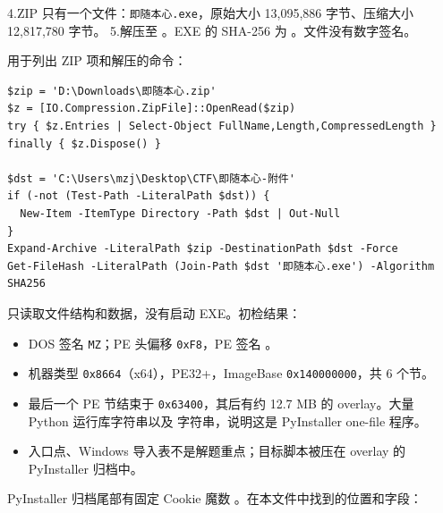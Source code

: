 4.ZIP 只有一个文件：\texttt{即随本心.exe}，原始大小 13,095,886 字节、压缩大小 12,817,780 字节。 5.解压至 \texttt{}。EXE 的 SHA-256 为 \texttt{}。文件没有数字签名。

用于列出 ZIP 项和解压的命令：

\begin{verbatim}
$zip = 'D:\Downloads\即随本心.zip'
$z = [IO.Compression.ZipFile]::OpenRead($zip)
try { $z.Entries | Select-Object FullName,Length,CompressedLength }
finally { $z.Dispose() }

$dst = 'C:\Users\mzj\Desktop\CTF\即随本心-附件'
if (-not (Test-Path -LiteralPath $dst)) {
  New-Item -ItemType Directory -Path $dst | Out-Null
}
Expand-Archive -LiteralPath $zip -DestinationPath $dst -Force
Get-FileHash -LiteralPath (Join-Path $dst '即随本心.exe') -Algorithm SHA256
\end{verbatim}

只读取文件结构和数据，没有启动 EXE。初检结果：

\begin{itemize}
\tightlist
\item
  DOS 签名 \texttt{MZ}；PE 头偏移 \texttt{0xF8}，PE 签名 \texttt{}。
\item
  机器类型 \texttt{0x8664}（x64），PE32+，ImageBase \texttt{0x140000000}，共 6 个节。
\item
  最后一个 PE 节结束于 \texttt{0x63400}，其后有约 12.7 MB 的 overlay。大量 Python 运行库字符串以及 \texttt{} 字符串，说明这是 PyInstaller one-file 程序。
\item
  入口点、Windows 导入表不是解题重点；目标脚本被压在 overlay 的 PyInstaller 归档中。
\end{itemize}

PyInstaller 归档尾部有固定 Cookie 魔数 \texttt{}。在本文件中找到的位置和字段：

